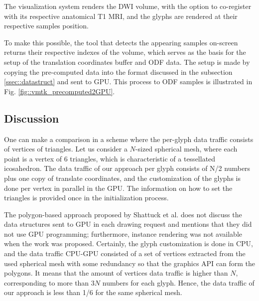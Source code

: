\documentclass[twoside,twocolumn,10pt]{article}
\begin{document}
The visualization system renders the DWI volume, with the option to co-register with its respective anatomical T1 MRI, and the glyphs are rendered at their respective samples position.

To make this possible, the tool that detects the appearing samples on-screen returns their respective indexes of the volume, which serves as the basis for the setup of the translation coordinates buffer and ODF data. The setup is made by copying the pre-computed data into the format discussed in the subsection \ref{ssec::datastruct} and sent to GPU. This process to ODF samples is illustrated in Fig. \ref{fig::vmtk_precomputed2GPU}.





\subsection{Discussion}

One can make a comparison in a scheme where the per-glyph data traffic consists of vertices of triangles. Let us consider a $N$-sized spherical mesh, where each point is a vertex of 6 triangles, which is characteristic of a tessellated icosahedron. The data traffic of our approach per glyph consists of N/2 numbers plus one copy of translate coordinates, and the customization of the glyphs is done per vertex in parallel in the GPU. The information on how to set the triangles is provided once in the initialization process.

The polygon-based approach proposed by Shattuck et al. \cite{shattuck2008} does not discuss the data structures sent to GPU in each drawing request and mentions that they did not use GPU programming; furthermore, instance rendering was not available when the work was proposed. Certainly, the glyph customization is done in CPU, and the data traffic CPU-GPU consisted of a set of vertices extracted from the used spherical mesh with some redundancy so that the graphics API can form the polygons. It means that the amount of vertices data traffic is higher than $N$, corresponding to more than $3N$ numbers for each glyph. Hence, the data traffic of our approach is less than 1/6 for the same spherical mesh.

\end{document}
